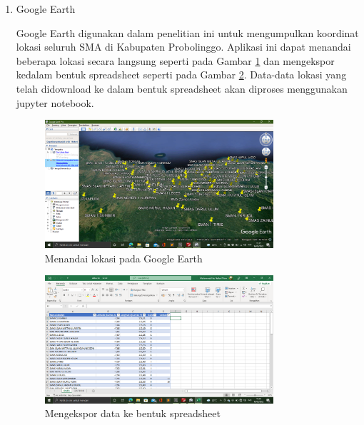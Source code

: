 \begin{enumerate}
	\item Google Earth
	
	Google Earth digunakan dalam penelitian ini untuk mengumpulkan koordinat lokasi seluruh SMA di Kabupaten Probolinggo. Aplikasi ini dapat menandai beberapa lokasi secara langsung seperti pada Gambar \ref{fig:markloc} dan mengekspor kedalam bentuk spreadsheet seperti pada Gambar \ref{fig:eksspread}. Data-data lokasi yang telah didownload ke dalam bentuk spreadsheet akan diproses menggunakan jupyter notebook.

\begin{figure}[H]
  \centering
  \includegraphics[width=0.8\textwidth]{Gambar/google earth.png}
  \caption{Menandai lokasi pada Google Earth}
  \label{fig:markloc}
\end{figure}

\begin{figure}[H]
  \centering
  \includegraphics[width=0.8\textwidth]{Gambar/ekspor spreadsheet.png}
  \caption{Mengekspor data ke bentuk spreadsheet}
  \label{fig:eksspread}
\end{figure}

\end{enumerate}

